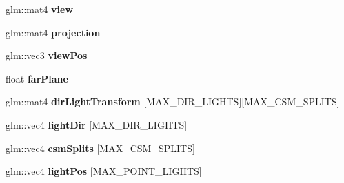 \begin{DoxyCompactItemize}
\item 
\mbox{\label{structblaze_1_1RendererUniformBufferObject_ad6783e280b81e7d310d1ea83b4bdcb7d}} 
glm\+::mat4 {\bfseries view}
\item 
\mbox{\label{structblaze_1_1RendererUniformBufferObject_a136d803fd393e2f3e2880ff4b38954fc}} 
glm\+::mat4 {\bfseries projection}
\item 
\mbox{\label{structblaze_1_1RendererUniformBufferObject_a67d792d66684cd9c2498e1d96a516b57}} 
glm\+::vec3 {\bfseries view\+Pos}
\item 
\mbox{\label{structblaze_1_1RendererUniformBufferObject_a4aafe7e01910fd77afbb751fc56f70c0}} 
float {\bfseries far\+Plane}
\item 
\mbox{\label{structblaze_1_1RendererUniformBufferObject_aed34a397173ccbd75938578a44279f28}} 
glm\+::mat4 {\bfseries dir\+Light\+Transform} \mbox{[}M\+A\+X\+\_\+\+D\+I\+R\+\_\+\+L\+I\+G\+H\+TS\mbox{]}\mbox{[}M\+A\+X\+\_\+\+C\+S\+M\+\_\+\+S\+P\+L\+I\+TS\mbox{]}
\item 
\mbox{\label{structblaze_1_1RendererUniformBufferObject_a5d2a2cdf14f07fab78883f538a12c4b6}} 
glm\+::vec4 {\bfseries light\+Dir} \mbox{[}M\+A\+X\+\_\+\+D\+I\+R\+\_\+\+L\+I\+G\+H\+TS\mbox{]}
\item 
\mbox{\label{structblaze_1_1RendererUniformBufferObject_afc4770224643d2cca738ecbf8f30c5f4}} 
glm\+::vec4 {\bfseries csm\+Splits} \mbox{[}M\+A\+X\+\_\+\+C\+S\+M\+\_\+\+S\+P\+L\+I\+TS\mbox{]}
\item 
\mbox{\label{structblaze_1_1RendererUniformBufferObject_a5a67be2e4e6179065a038453bfba22b5}} 
glm\+::vec4 {\bfseries light\+Pos} \mbox{[}M\+A\+X\+\_\+\+P\+O\+I\+N\+T\+\_\+\+L\+I\+G\+H\+TS\mbox{]}
\item 
\mbox{\label{structblaze_1_1RendererUniformBufferObject_a5d5d31e10cf970bdba48636fcfb88c02}} 

\end{DoxyCompactItemize}
